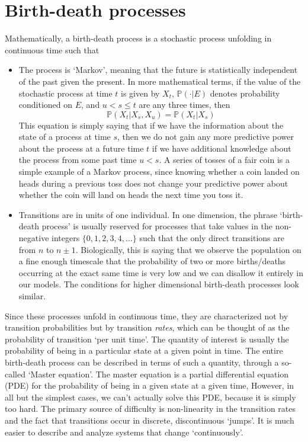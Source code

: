 \section{Birth-death processes}
Mathematically, a birth-death process is a stochastic process unfolding in continuous time such that
\begin{itemize}
	\item The process is `Markov', meaning that the future is statistically independent of the past given the present. In more mathematical terms, if the value of the stochastic process at time $t$ is given by $X_t$, $\mathbb{P}(\cdot | E)$ denotes probability conditioned on $E$, and $u < s \leq t$ are any three times, then
	\begin{equation*}
		\mathbb{P}(X_t | X_s, X_u) = \mathbb{P}(X_t | X_s)
	\end{equation*}
	This equation is simply saying that if we have the information about the state of a process at time $s$, then we do not gain any more predictive power about the process at a future time $t$ if we have additional knowledge about the process from some past time $u < s$. A series of tosses of a fair coin is a simple example of a Markov process, since knowing whether a coin landed on heads during a previous toss does not change your predictive power about whether the coin will land on heads the next time you toss it.
	\item Transitions are in units of one individual. In one dimension, the phrase `birth-death process' is usually reserved for processes that take values in the non-negative integers $\{0,1,2,3,4,\ldots\}$ such that the only direct transitions are from $n$ to $n \pm 1$. Biologically, this is saying that we observe the population on a fine enough timescale that the probability of two or more births/deaths occurring at the exact same time is very low and we can disallow it entirely in our models. The conditions for higher dimensional birth-death processes look similar.
\end{itemize}
Since these processes unfold in continuous time, they are characterized not by transition probabilities but by transition \emph{rates}, which can be thought of as the probability of transition `per unit time'. The quantity of interest is usually the probability of being in a particular state at a given point in time. The entire birth-death process can be described in terms of such a quantity, through a so-called `Master equation'. The master equation is a partial differential equation (PDE) for the probability of being in a given state at a given time, However, in all but the simplest cases, we can't actually solve this PDE, because it is simply too hard. The primary source of difficulty is non-linearity in the transition rates and the fact that transitions occur in discrete, discontinuous `jumps'. It is much easier to describe and analyze systems that change `continuously'.

